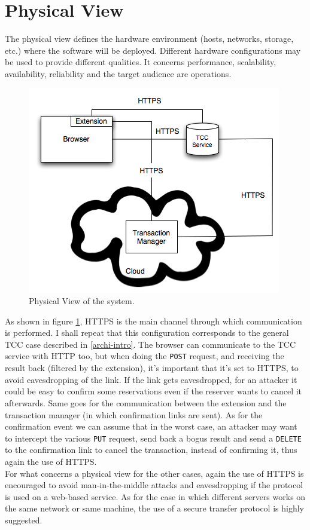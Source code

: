 \section{Physical View}
The physical view defines the hardware environment (hosts, networks, storage, etc.) where the software will be deployed. Different hardware configurations may be used to provide different qualities. It concerns 	performance, scalability, availability, reliability and the target audience are operations.

\begin{figure} [ht]
\centering
\includegraphics[scale=0.75]{images/physical_view.jpg}
\caption{Physical View of the system.}
\label{tcc-physical-view}
\end{figure}

As shown in figure \ref{tcc-physical-view}, HTTPS is the main channel through which communication is performed. I shall repeat that this configuration corresponds to the general TCC case described in \ref{archi-intro}. The browser can communicate to the TCC service with HTTP too, but when doing the {\tt POST} request, and receiving the result back (filtered by the extension), it's important that it's set to HTTPS, to avoid eavesdropping of the link. If the link gets eavesdropped, for an attacker it could be easy to confirm some reservations even if the reserver wants to cancel it afterwards. Same goes for the communication between the extension and the transaction manager (in which confirmation links are sent). As for the confirmation event we can assume that in the worst case, an attacker may want to intercept the various {\tt PUT} request, send back a bogus result and send a {\tt DELETE} to the confirmation link to cancel the transaction, instead of confirming it, thus again the use of HTTPS.\\
For what concerns a physical view for the other cases, again the use of HTTPS is encouraged to avoid man-in-the-middle attacks and eavesdropping if the protocol is used on a web-based service. As for the case in which different servers works on the same network or same machine, the use of a secure transfer protocol is highly suggested.

